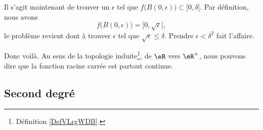 Il s'agit maintenant de trouver un \( \epsilon\) tel que \( f\big( B(0,\epsilon) \big)\subset [0,\delta[\). Par définition, nous avons
\[
	f\big( B(0,\epsilon) \big)=[0,\sqrt{\epsilon}[,
\]
le problème revient dont à trouver \( \epsilon\) tel que \( \sqrt{\epsilon}\leq\delta\). Prendre \( \epsilon<\delta^2\) fait l'affaire.

Donc voilà. Au sens de la topologie induite\footnote{Définition \ref{DefVLrgWDB}.}, de \( \eR\) vers \( \eR^+\), nous pouvons dire que la fonction racine carrée est partout continue.

\subsection{Second degré}

